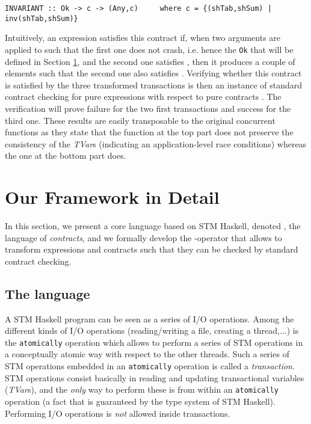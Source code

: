 \documentclass[submission,copyright,creativecommons]{eptcs}
\begin{document}
\begin{footnotesize}
\begin{verbatim}
INVARIANT :: Ok -> c -> (Any,c)     where c = {(shTab,shSum) | inv(shTab,shSum)} 
\end{verbatim}
\end{footnotesize}
Intuitively, an expression  satisfies this contract if, when two arguments are applied to  such that the first one does not crash, i.e. hence the \texttt{Ok} that will be defined in Section \ref{details}, and the second one satisfies , then it produces a couple of elements such that the second one also satisfies .  
Verifying whether this contract is satisfied by the three transformed transactions is then an instance of standard contract checking for pure expressions with respect to pure contracts \cite{static-contract-checking}. The verification will prove failure for the two first transactions and success for the third one. 
These results are easily transposable to the original concurrent functions as they state that the function at the top part does not preserve the consistency of the \emph{TVar}s (indicating an application-level race conditions) whereas the one at the bottom part does.


\section{Our Framework in Detail}
\label{details}
In this section, we present a core language based on STM Haskell, denoted , the language of {\em contracts}, and we formally develop the -operator that allows to transform expressions and contracts such that they can be checked by standard contract checking.



\subsection{The language}
\label{language}


A STM Haskell program can be seen as a series of I/O operations. 
Among the different kinds of I/O operations (reading/writing a file, creating a thread,...) is the \texttt{atomically} operation which allows to perform a series of STM operations in a conceptually atomic way with respect to the other threads. Such a series of STM operations embedded in an \texttt{atomically} operation is called a \emph{transaction}. 
STM operations consist basically in reading and updating transactional variables (\emph{TVar}s), and the \emph{only} way to perform these is from within an \texttt{atomically} operation (a fact that is guaranteed by the type system of STM Haskell). Performing I/O operations is \emph{not} allowed inside transactions.
\end{document}
